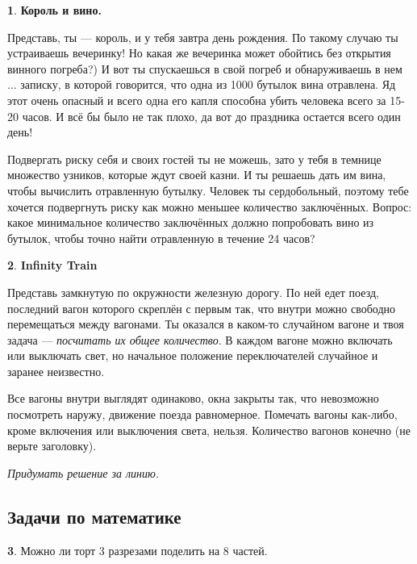 \documentclass[14pt, a4paper]{extarticle}
\theoremstyle{definition}
\newtheorem{problem}{}
\theoremstyle{definition}
\theoremstyle{remark}
\numberwithin{equation}{section}
\begin{document}
\begin{problem}
    \textbf{Король и вино.}

    Представь, ты --- король, и у тебя завтра день рождения. По такому случаю ты устраиваешь
    вечеринку! Но какая же вечеринка может обойтись без открытия винного погреба?)
    И вот ты спускаешься в свой погреб и обнаруживаешь в нем ... записку, в которой говорится,
    что одна из 1000 бутылок вина отравлена. Яд этот очень опасный и всего одна его капля
    способна убить человека всего за 15-20 часов. И всё бы было не так плохо, да вот до праздника
    остается всего один день! 
    
    Подвергать риску себя и своих гостей ты не можешь, зато у тебя 
    в темнице множество узников, которые ждут своей казни. И ты решаешь дать им вина,
    чтобы вычислить отравленную бутылку. Человек ты сердобольный, поэтому тебе хочется подвергнуть
    риску как можно меньшее количество заключённых. Вопрос: какое минимальное количество 
    заключённых должно попробовать вино из бутылок, чтобы точно найти отравленную в течение 24 часов?
\end{problem}

\begin{problem}
    \textbf{Infinity Train}

    Представь замкнутую по окружности железную дорогу. 
    По ней едет поезд, последний вагон которого скреплён с первым так, 
    что внутри можно свободно перемещаться между вагонами. 
    Ты оказался в каком-то случайном вагоне и твоя задача — \textit{посчитать 
    их общее количество}. В каждом вагоне можно включать или выключать 
    свет, но начальное положение переключателей случайное и заранее неизвестно.

    Все вагоны внутри выглядят одинаково, окна закрыты так, что невозможно 
    посмотреть наружу, движение поезда равномерное. Помечать вагоны как-либо, 
    кроме включения или выключения света, нельзя. 
    Количество вагонов конечно (не верьте заголовку).

    \textit{Придумать решение за линию.}
\end{problem}

\subsection*{Задачи по математике}
\setcounter{problem}{0}

\begin{problem}
    Можно ли торт 3 разрезами поделить на 8 частей.
\end{problem}
\end{document}
